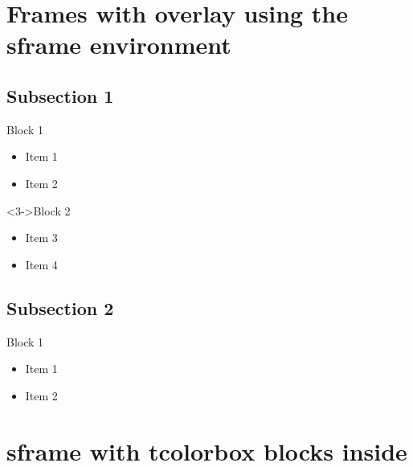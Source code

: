 \documentclass{beamer}
\begin{document}
    \section*{Frames with overlay using the sframe environment}

    \subsection*{Subsection 1}
    
        \begin{sframe}
            \begin{block}{Block 1}
                \begin{itemize}
                    \item<1-> Item 1
                    \item<2-> Item 2
                \end{itemize}
            \end{block}
            \begin{block}<3->{Block 2}
                \begin{itemize}
                    \item<3-> Item 3
                    \item<4-> Item 4
                \end{itemize}
            \end{block}
        \end{sframe}
    
    \subsection*{Subsection 2}
    
        \begin{sframe}[Subtitle]
            \begin{block}{Block 1}
                \begin{itemize}
                    \item Item 1
                    \item Item 2
                \end{itemize}
            \end{block}
        \end{sframe}

    
    \section*{sframe with tcolorbox blocks inside}
\end{document}
